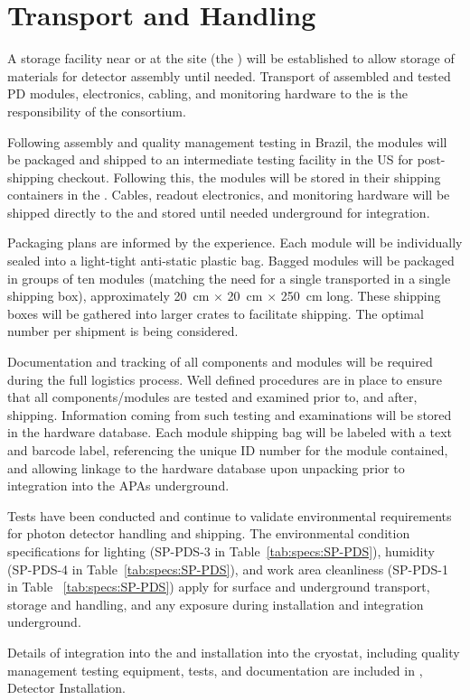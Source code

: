 \section{Transport and Handling}
\label{sec:fdsp-pd-install}

A storage facility near or at the  site (the ) will be established to allow storage of materials for detector assembly until needed.  Transport of assembled and tested PD modules, electronics, cabling, and monitoring hardware to the  is the responsibility of the  consortium.

Following assembly and quality management testing in Brazil, the  modules  will be packaged and shipped to an intermediate testing facility in the US for post-shipping checkout. Following this, the modules will be stored in their shipping containers in the .  Cables, readout electronics, and monitoring hardware will be shipped directly to the  and stored until needed underground for integration.

Packaging plans are informed by the  experience.  Each  module will be individually sealed into a light-tight anti-static plastic bag.  Bagged modules will be packaged in groups of ten modules (matching the need for a single  transported in a single shipping box), approximately \SI{20}{cm} $\times$ \SI{20}{cm} $\times$ \SI{250}{cm} long.  These shipping boxes will be gathered into larger crates to facilitate shipping.  The optimal number per shipment is being considered.

Documentation and tracking of all components and  modules will be required during the full logistics process. Well defined procedures are in place to ensure that all components/modules are tested and examined prior to, and after, shipping. Information coming from such testing and examinations will be stored in the  hardware database.  Each  module shipping bag will be labeled with a text and barcode label, referencing the unique ID number for the module contained, and allowing linkage to the hardware database upon unpacking prior to integration into the APAs underground.

Tests have been conducted and continue to validate environmental requirements for photon detector handling and shipping. The environmental condition specifications for lighting (SP-PDS-3 in Table~\ref{tab:specs:SP-PDS}), humidity (SP-PDS-4 in Table~\ref{tab:specs:SP-PDS}), and work area cleanliness (SP-PDS-1 in Table ~\ref{tab:specs:SP-PDS})
apply for surface and underground transport, storage and handling, and any exposure during installation and integration underground. 


Details of  integration into the  and installation into the cryostat, including quality management testing equipment, tests, and documentation are included in \spchinstall{}, Detector Installation. 

